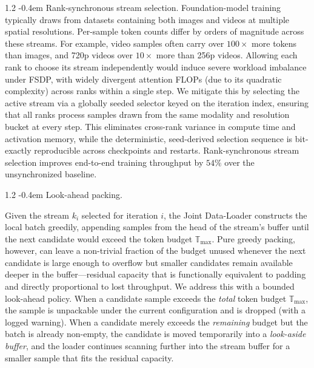 \documentclass{llmxive}
\makeatletter
\providecommand{\paragraph}{  \@startsection{paragraph}{4}{\z@}    {1\baselineskip \@plus .2\baselineskip}    {-0.4em}    {\normalfont\normalsize\bfseries}}
\makeatother
\begin{document}
\paragraph{Rank-synchronous stream selection.}
Foundation-model training typically draws from datasets containing both images and videos at multiple spatial resolutions. Per-sample token counts differ by orders of magnitude across these streams. For example, video samples often carry over $100\times$ more tokens than images, and 720p videos over $10\times$ more than 256p videos. Allowing each rank to choose its stream independently would induce severe workload imbalance under FSDP, with widely divergent attention FLOPs (due to its quadratic complexity) across ranks within a single step. We mitigate this by selecting the active stream via a globally seeded selector keyed on the iteration index, ensuring that all ranks process samples drawn from the same modality and resolution bucket at every step. This eliminates cross-rank variance in compute time and activation memory, while the deterministic, seed-derived selection sequence is bit-exactly reproducible across checkpoints and restarts. Rank-synchronous stream selection improves end-to-end training throughput by $54\%$ over the unsynchronized baseline.

\paragraph{Look-ahead packing.}

Given the stream $k_i$ selected for iteration $i$, the Joint Data-Loader constructs the local batch greedily, appending samples from the head of the stream's buffer until the next candidate would exceed the token budget $\mathbb{T}_{\max}$. Pure greedy packing, however, can leave a non-trivial fraction of the budget unused whenever the next candidate is large enough to overflow but smaller candidates remain available deeper in the buffer---residual capacity that is functionally equivalent to padding and directly proportional to lost throughput. We address this with a bounded look-ahead policy. When a candidate sample exceeds the \emph{total} token budget $\mathbb{T}_{\max}$, the sample is unpackable under the current configuration and is dropped (with a logged warning). When a candidate merely exceeds the \emph{remaining} budget but the batch is already non-empty, the candidate is moved temporarily into a \emph{look-aside buffer}, and the loader continues scanning further into the stream buffer for a smaller sample that fits the residual capacity.
\end{document}
